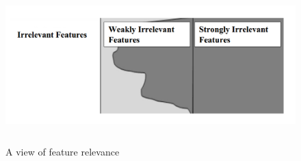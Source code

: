 \documentclass[document.tex]{subfiles}
\begin{document}
	\begin{figure}[H]
	\begin{center}
		\includegraphics[height=6.0cm]{imgs/relevance.png}
	\end{center}
	\caption{ A view of feature relevance}
	\label{fig: A view of feature relevance}
    \end{figure}
\end{document}
